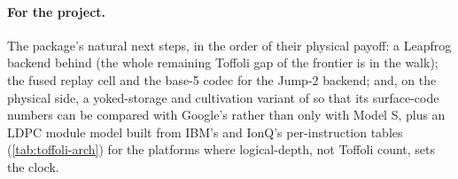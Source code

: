 \paragraph{For the  project.} The package's natural next steps, in the order of their physical payoff: a Leapfrog backend behind  (the whole remaining Toffoli gap of the frontier is in the walk); the fused replay cell and the base-5 codec for the Jump-2 backend; and, on the physical side, a yoked-storage and cultivation variant of  so that its surface-code numbers can be compared with Google's rather than only with Model S, plus an LDPC module model built from IBM's and IonQ's per-instruction tables (\cref{tab:toffoli-arch}) for the platforms where logical-depth, not Toffoli count, sets the clock.
